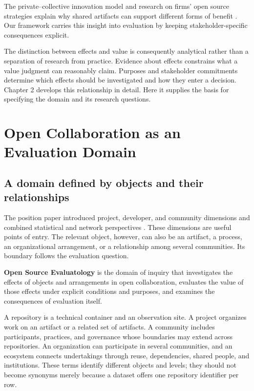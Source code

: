 The private--collective innovation model and research on firms' open source strategies explain why shared artifacts can support different forms of benefit \citep{vonhippel2003,west2006}. Our framework carries this insight into evaluation by keeping stakeholder-specific consequences explicit.

The distinction between effects and value is consequently analytical rather than a separation of research from practice. Evidence about effects constrains what a value judgment can reasonably claim. Purposes and stakeholder commitments determine which effects should be investigated and how they enter a decision. Chapter 2 develops this relationship in detail. Here it supplies the basis for specifying the domain and its research questions.

\section{Open Collaboration as an Evaluation Domain}
\label{sec:field}

\subsection{A domain defined by objects and their relationships}
The position paper introduced project, developer, and community dimensions and combined statistical and network perspectives \citep{han2024ose}. These dimensions are useful points of entry. The relevant object, however, can also be an artifact, a process, an organizational arrangement, or a relationship among several communities. Its boundary follows the evaluation question.

\begin{definitionbox}
\textbf{Open Source Evaluatology} is the domain of inquiry that investigates the effects of objects and arrangements in open collaboration, evaluates the value of those effects under explicit conditions and purposes, and examines the consequences of evaluation itself.
\end{definitionbox}

A repository is a technical container and an observation site. A project organizes work on an artifact or a related set of artifacts. A community includes participants, practices, and governance whose boundaries may extend across repositories. An organization can participate in several communities, and an ecosystem connects undertakings through reuse, dependencies, shared people, and institutions. These terms identify different objects and levels; they should not become synonyms merely because a dataset offers one repository identifier per row.

